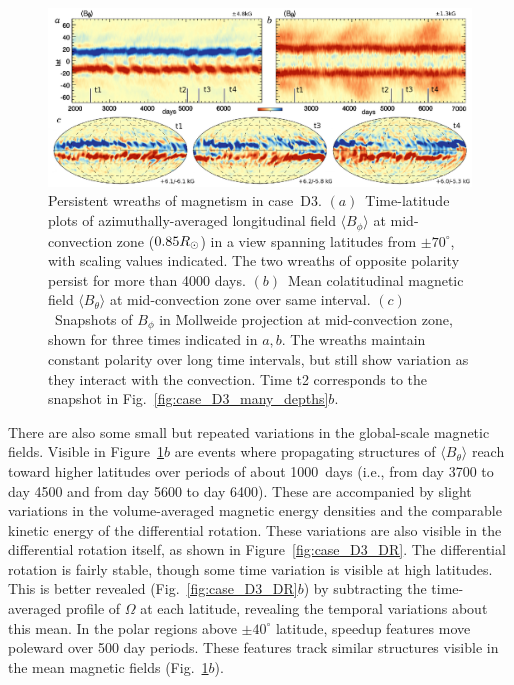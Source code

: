 \begin{figure}[!t]
  \vskip0.2cm
  \begin{center}
    \includegraphics[width=\linewidth]{figs/chapter_5/Figure_4/Figure_4.eps}
  \end{center}
  \caption[Persistent wreaths of magnetism in case~D3]
          {Persistent wreaths of magnetism in case~D3.  
  $(a)$~Time-latitude plots of
  azimuthally-averaged longitudinal field $\langle B_\phi \rangle$ 
  at mid-convection zone ($0.85R_\odot$) in a view spanning latitudes from
  $\pm 70^\circ$, with scaling values
  indicated.  The two wreaths of opposite polarity persist for more
  than 4000 days. $(b)$~Mean colatitudinal magnetic field 
  $\langle B_\theta \rangle$ at
  mid-convection zone over same interval.  $(c)$~Snapshots of $B_\phi$
  in Mollweide projection at mid-convection zone, shown for three
  times indicated in $a,b$.  The wreaths maintain constant polarity
  over long time intervals, but still show variation as they interact
  with the convection.  Time t2 corresponds to the snapshot in 
  Fig.~\ref{fig:case_D3_many_depths}$b$.
  \label{fig:case_D3_time_evolution}}
\end{figure}


There are also some small but repeated variations in the global-scale magnetic fields.
Visible in Figure~\ref{fig:case_D3_time_evolution}$b$ are
events where propagating structures of $\langle B_\theta \rangle$ reach toward
higher latitudes over periods of about 1000~days (i.e., from day 3700
to day 4500 and from day 5600 to day 6400).  These are accompanied by
slight variations in the volume-averaged magnetic energy densities and
the comparable kinetic energy of the differential rotation.
These variations are also visible in the differential rotation itself,
as shown in Figure~\ref{fig:case_D3_DR}.  The differential rotation
is fairly stable, though some time variation is visible at high
latitudes.  This is better revealed (Fig.~\ref{fig:case_D3_DR}$b$)
by subtracting the time-averaged profile of $\Omega$ at each
latitude, revealing the temporal variations about this mean.   
In the polar regions above $\pm 40^\circ$ latitude, speedup features
move poleward over 500 day periods.  These features
track similar structures visible in the mean magnetic fields
(Fig.~\ref{fig:case_D3_time_evolution}$b$).   

